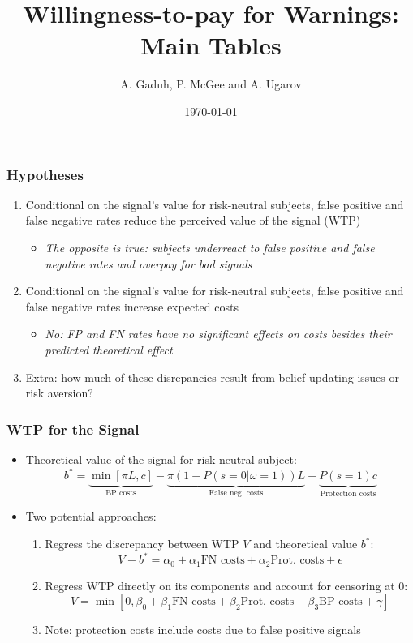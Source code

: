 \documentclass[11pt,hyperref={bookmarks=false}]{beamer}
\title[Willingness-to-pay for Warnings]{Willingness-to-pay for Warnings: Main Tables}
\author[A. Gaduh, P. McGee and A. Ugarov]{A. Gaduh, P. McGee and A. Ugarov}
\institute[]{}
\date{\today}
\newcommand\BackgroundPic{%
\put(0,0){%
\parbox[b][\paperheight]{\paperwidth}{%
\vfill
\centering
\vfill
}}}
\begin{document}

\begin{frame}
\titlepage
\end{frame}




\begin{frame}
\frametitle{Hypotheses}
\begin{enumerate}
\item Conditional on the signal's value for risk-neutral subjects, false positive and false negative rates reduce the perceived value of the signal (WTP)
\begin{itemize}
\item \textit{The opposite is true: subjects underreact to false positive and false negative rates and overpay for bad signals}
\end{itemize}
\item Conditional on the signal's value for risk-neutral subjects, false positive and false negative rates increase expected costs
\begin{itemize}
\item \textit{No: FP and FN rates have no significant effects on costs besides their predicted theoretical effect}
\end{itemize}
\item Extra: how much of these disrepancies result from belief updating issues or risk aversion? 
\end{enumerate}
\end{frame}



\begin{frame}
\frametitle{WTP for the Signal}
\begin{itemize}
\item Theoretical value of the signal for risk-neutral subject:
$$b^*=\underbrace{\min[\pi L,c]}_{\text{BP costs}}-\underbrace{\pi(1-P(s=0|\omega=1))L}_{\text{False neg. costs}}-\underbrace{P(s=1)c}_{\text{Protection costs}}$$
\item Two potential approaches:
\begin{enumerate}
\item Regress the discrepancy between WTP $V$ and theoretical value $b^*$:
$$V-b^*=\alpha_0+\alpha_1\text{FN costs}+\alpha_2 \text{Prot. costs}+\epsilon$$
\item Regress WTP directly on its components and account for censoring at 0:
$$V=\min[0,\beta_0+\beta_1\text{FN costs}+\beta_2 \text{Prot. costs}-\beta_3\text{BP costs}+\gamma]$$
\item Note: protection costs include costs due to false positive signals
\end{enumerate}
\end{itemize}
\end{frame}
\end{document}
